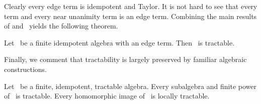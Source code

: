 Clearly every edge term is idempotent and Taylor. It is not hard to see that every \malcev term and every near unanimity term is an edge term. Combining the main results of \cite{MR2563736} and~\cite{MR2678065} yields the following theorem.

\begin{theorem}\label{thm:edge-tractable}
Let \bA\ be a finite idempotent algebra with an edge term. Then \bA\ is tractable. 
\end{theorem}

Finally, we comment that tractability is largely preserved by familiar algebraic constructions.

\begin{theorem}[\cite{MR2137072}]\label{thm:HSP-tract}
Let \bA\ be a finite, idempotent, tractable algebra. Every subalgebra and finite power of \bA\ is tractable. Every homomorphic image of \bA\ is locally tractable. 
\end{theorem}



